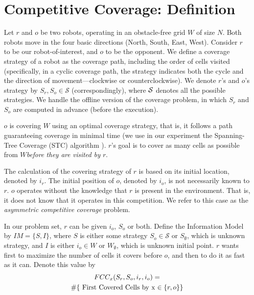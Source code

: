 \documentclass[a4paper,10pt]{article}
\newcommand\rob{\ensuremath{r}\xspace}
\newcommand\opp{\ensuremath{o}\xspace}
\newcommand{\w}{\ensuremath{W}\xspace}
\newcommand{\fcc}{\ensuremath{FCC}\xspace}
\begin{document}

\section{Competitive Coverage: Definition}
Let \rob and \opp be two robots, operating in an obstacle-free grid \w of size $N$. Both robots move in the four basic directions (North, South, East, West). Consider \rob to be our robot-of-interest, and \opp to be the opponent. 
We define a coverage strategy of a robot as the coverage path, including the order of cells visited (specifically, in a cyclic coverage path, the strategy indicates both the cycle and the direction of movement---clockwise or counterclockwise). We denote \rob's and \opp's strategy by $S_{\rob},S_{\opp}\in \mathcal{S}$ (correspondingly), where $\cal{S}$ denotes all the possible strategies. We handle the offline version of the coverage problem, in which $S_{\rob}$ and $S_{\opp}$ are computed in advance (before the execution). 

\opp is covering \w using an optimal coverage strategy, that is, it follows a path guaranteeing coverage in minimal time (we use in our experiment the Spanning-Tree Coverage (STC) algorithm \cite{gabriely2001spanning}). \rob's goal is to cover as many cells as possible from \w {\em before they are visited by \rob}. 


The calculation of the covering strategy of \rob is based on its initial location, denoted by $i_r$. The initial position of \opp, denoted by $i_{\opp}$, is not necessarily known to \rob.
\opp operates without the knowledge that \rob is present in the environment. That is, it does not know that it operates in this competition. We refer to this case as the {\em asymmetric competitive coverage} problem. %

In our problem set, \rob can be given $i_{\opp}$, $S_{\opp}$ or both. Define the Information Model by $IM=\lbrace S,I\rbrace$, where $S$ is either some strategy $S_{\opp}\in \mathcal{S}$ or $S_\emptyset$, which is unknown strategy, and $I$ is either $i_{\opp}\in W$ or $\w_{\emptyset}$, which is unknown initial point. \rob wants first to maximize the number of cells it covers before \opp, and then to do it as fast as it can. Denote this value by  
\begin{multline*}
\fcc_{x}(S_{\rob}, S_{\opp}, i_{\rob}, i_{\opp} )= \\
\# \lbrace \textnormal{ First Covered Cells by x $\in \lbrace\rob,\opp\rbrace$} \rbrace 
\end{multline*} 
\end{document}
